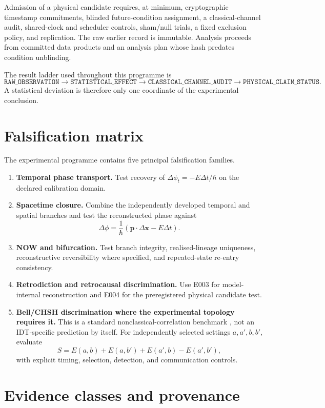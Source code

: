 Admission of a physical candidate requires, at minimum, cryptographic timestamp commitments, blinded future-condition assignment, a classical-channel audit, shared-clock and scheduler controls, sham/null trials, a fixed exclusion policy, and replication. The raw earlier record is immutable. Analysis proceeds from committed data products and an analysis plan whose hash predates condition unblinding.

The result ladder used throughout this programme is
\[
\texttt{RAW\_OBSERVATION}
\rightarrow
\texttt{STATISTICAL\_EFFECT}
\rightarrow
\texttt{CLASSICAL\_CHANNEL\_AUDIT}
\rightarrow
\texttt{PHYSICAL\_CLAIM\_STATUS}.
\]
A statistical deviation is therefore only one coordinate of the experimental conclusion.

\section{Falsification matrix}

The experimental programme contains five principal falsification families.

\begin{enumerate}
\item \textbf{Temporal phase transport.} Test recovery of \(\Delta\phi_t=-E\Delta t/\hbar\) on the declared calibration domain.
\item \textbf{Spacetime closure.} Combine the independently developed temporal and spatial branches and test the reconstructed phase against
\[
\Delta\phi=\frac{1}{\hbar}
\left(\mathbf p\cdot\Delta\mathbf x-E\Delta t\right).
\]
\item \textbf{NOW and bifurcation.} Test branch integrity, realised-lineage uniqueness, reconstructive reversibility where specified, and repeated-state re-entry consistency.
\item \textbf{Retrodiction and retrocausal discrimination.} Use E003 for model-internal reconstruction and E004 for the preregistered physical candidate test.
\item \textbf{Bell/CHSH discrimination where the experimental topology requires it.} This is a standard nonclassical-correlation benchmark \cite{Bell1964,CHSH1969}, not an IDT-specific prediction by itself. For independently selected settings \(a,a',b,b'\), evaluate
\[
S=E(a,b)+E(a,b')+E(a',b)-E(a',b'),
\]
with explicit timing, selection, detection, and communication controls.
\end{enumerate}

\section{Evidence classes and provenance}

